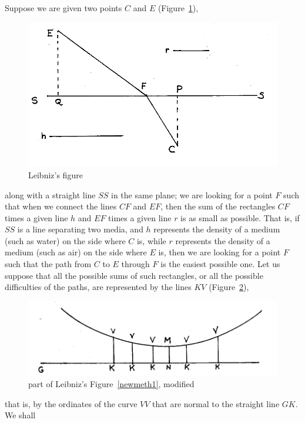 \documentclass[polutonikogreek,english,twoside,openright]{article}
\begin{document}
\label{bnmex2} Suppose we are given two points $C$ and $E$
(Figure~\ref{leasttime}),
\begin{figure}[htp]
  \begin{center}
    \includegraphics[width=.75\textwidth]{fig/Figure21}
    \caption{Leibniz's figure}
    \label{leasttime}
  \end{center}
\end{figure} along with a straight line $SS$ in the same plane; we are
looking for a point $F$ such that when we connect the lines $CF$ and
$EF$, then the sum of the rectangles $CF$ times a given line $h$ and
$EF$ times a given line $r$ is as small as possible.  That is, if $SS$
is a line separating two media, and $h$ represents the density of a
medium (such as water) on the side where $C$ is, while $r$ represents
the density of a medium (such as air) on the side where $E$ is, then
we are looking for a point $F$ such that the path from $C$ to $E$
through $F$ is the easiest possible one. Let us suppose that all the possible sums of
such rectangles, or all the possible difficulties of the paths, are
represented by the lines $KV$ (Figure~\ref{leasttime2}),
\begin{figure}[htp]
  \begin{center}
    \includegraphics[width=.75\textwidth]{fig/Figure22}
    \caption{part of Leibniz's Figure~\ref{newmeth1}, modified}
    \label{leasttime2}
  \end{center}
\end{figure}
that is, by the ordinates of the curve $VV$ that are normal to the
straight line $GK$. We shall
\end{document}
